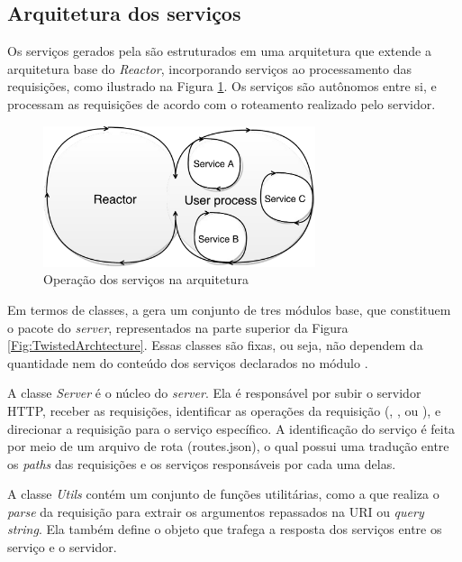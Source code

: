 \subsection{Arquitetura dos serviços \twisted{}}
\label{ArquiteturaTwisted}

Os serviços \twisted{} gerados pela \neoidl{} são estruturados em uma
arquitetura que extende a arquitetura base do \twisted{} \emph{Reactor},
incorporando serviços ao processamento das requisições, como ilustrado na Figura
\ref{Fig:TwistedReactorServices}. Os serviços são autônomos entre si, e
processam as requisições de acordo com o roteamento realizado pelo servidor.

\begin{figure}[!htb]
\centering
\includegraphics[width=80mm,trim = 0mm 0mm 0mm
0mm,clip]{img/TwistedReactorServices.pdf}
\caption{Operação dos serviços na arquitetura \twisted{}}
\label{Fig:TwistedReactorServices}
\end{figure}

Em termos de classes, a \neoidl{} gera um conjunto de tres módulos base,
que constituem o pacote do \twisted{} \textit{server}, representados na
parte superior da Figura \ref{Fig:TwistedArchtecture}. Essas classes são fixas,
ou seja, não dependem da quantidade nem do conteúdo dos serviços declarados no
módulo \neoidl{}.

A classe \emph{Server} é o núcleo do \twisted{} \textit{server}. Ela é
responsável por subir o servidor HTTP, receber as requisições, identificar
as operações da requisição (, ,  ou ), e
direcionar a requisição para o serviço específico. A identificação do serviço é
feita por meio de um arquivo de rota (routes.json), o qual possui uma tradução
entre os \emph{paths} das requisições e os serviços responsáveis por cada uma
delas.

A classe \emph{Utils} contém um conjunto de funções utilitárias, como a que
realiza o \textit{parse} da requisição para extrair os argumentos repassados
na URI ou \textit{query string}. Ela também define o objeto que trafega a
resposta dos serviços entre os serviço e o servidor.

